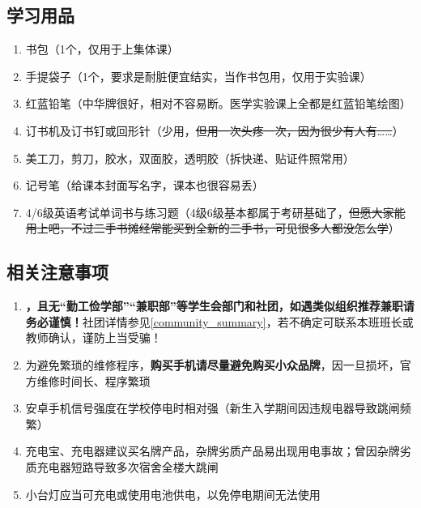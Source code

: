 \subsection[学习用品]{学习用品}
\begin{enumerate}
      \item 书包（1个，仅用于上集体课）
      \item 手提袋子（1个，要求是耐脏便宜结实，当作书包用，仅用于实验课\footnotemark）
      \item 红蓝铅笔（中华牌很好，相对不容易断。医学实验课上全都是红蓝铅笔绘图）
      \item 订书机及订书钉或回形针（少用，\sout{但用一次头疼一次，因为很少有人有……}）
      \item 美工刀，剪刀，胶水，双面胶，透明胶（拆快递、贴证件照常用）
      \item 记号笔（给课本封面写名字，课本也很容易丢）
      \item 4/6级英语考试单词书与练习题（4级6级基本都属于考研基础了，\sout{但愿大家能用上吧，不过\linebreak[3]二手书摊经常能买到全新的二手书，可见很多人都没怎么学}）
\end{enumerate}

\subsection[相关注意事项]{相关注意事项}
\begin{enumerate}
      \item \textbf{，且无“勤工俭学部”“兼职部”等学生会部门和社团，如遇类似组织推荐兼职请务必谨慎！}社团详情参见\uline{\ref{community_summary}}，若不确定可联系本班班长或教师确认，谨防上当受骗！
      \item 为避免繁琐的维修程序，\textbf{购买手机请尽量避免购买小众品牌}，因一旦损坏，官方维修时间长、程序繁琐
      \item 安卓手机信号强度在学校停电时相对强（新生入学期间因违规电器导致跳闸频繁）
      \item 充电宝、充电器建议买名牌产品，杂牌劣质产品易出现用电事故；曾因杂牌劣质充电器短路导致多次宿舍全楼大跳闸
      \item 小台灯应当可充电或使用电池供电，以免停电期间无法使用
\end{enumerate}